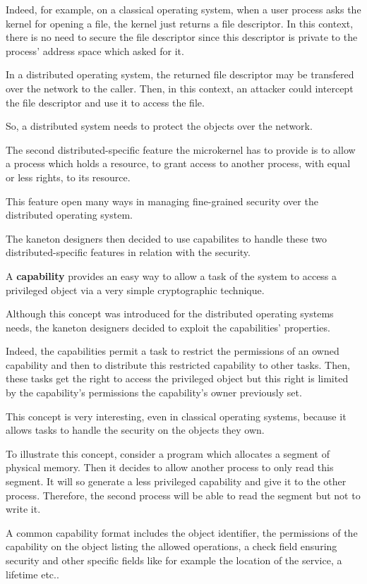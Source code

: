 {\begin{multicols}{2}
Indeed, for example, on a classical operating system, when a user process
asks the kernel for opening a file, the kernel just returns a file descriptor.
In this context, there is no need to secure the file descriptor since
this descriptor is private to the process' address space which asked for it.

In a distributed operating system, the returned file descriptor may
be transfered over the network to the caller. Then, in this context,
an attacker could intercept the file descriptor and use it to access
the file.

So, a distributed system needs to protect the objects over the network.

The second distributed-specific feature the microkernel has to provide
is to allow a process which holds a resource, to grant access to another
process, with equal or less rights, to its resource.

This feature open many ways in managing fine-grained security over
the distributed operating system.

The kaneton designers then decided to use capabilites to handle these
two distributed-specific features in relation with the security.

A \textbf{capability} provides an easy way to allow a task of the
system to access a privileged object via a very simple cryptographic
technique.

Although this concept was introduced for the distributed operating systems
needs, the kaneton designers decided to exploit the capabilities' properties.

Indeed, the capabilities permit a task to restrict the permissions
of an owned capability and then to distribute this restricted capability
to other tasks. Then, these tasks get the right to access the privileged
object but this right is limited by the capability's permissions the
capability's owner previously set.

This concept is very interesting, even in classical operating systems,
because it allows tasks to handle the security on the objects they own.

To illustrate this concept, consider a program which allocates a segment of
physical memory. Then it decides to allow another process to only read
this segment. It will so generate a less privileged capability and give
it to the other process. Therefore, the second process will be able to read
the segment but not to write it.

A common capability format includes the object identifier, the permissions
of the capability on the object listing the allowed operations, a check field
ensuring security and other specific fields like for example the location
of the service, a lifetime etc..


\end{multicols}}
